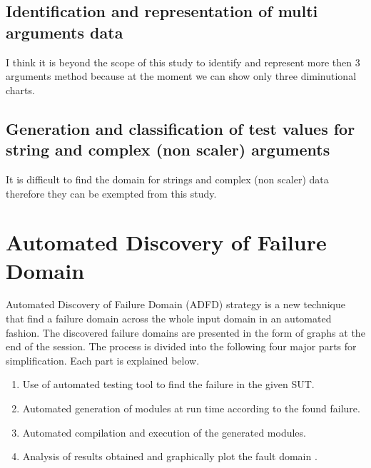 \documentclass{acm_proc_article-sp}
\begin{document}
\subsection{Identification and representation of multi arguments data}
I think it is beyond the scope of this study to identify and represent more then 3 arguments method because at the moment we can show only three diminutional charts.
\subsection{Generation and classification of test values for string and complex (non scaler) arguments}
It is difficult to find the domain for strings and complex (non scaler) data therefore they can be exempted from this study.


\section{Automated Discovery of Failure Domain}\label{sec:adfd}

Automated Discovery of Failure Domain (ADFD) strategy is a new technique that find a failure domain across the whole input domain in an automated fashion. The discovered failure domains are presented in the form of graphs at the end of the session. The process is divided into the following four major parts for simplification. Each part is explained below.

\begin{enumerate}
\item Use of automated testing tool to find the failure in the given SUT.
\item Automated generation of modules at run time according to the found failure.
\item Automated compilation and execution of the generated modules.
\item Analysis of results obtained and graphically plot the fault domain .\\
\end{enumerate}
\end{document}

